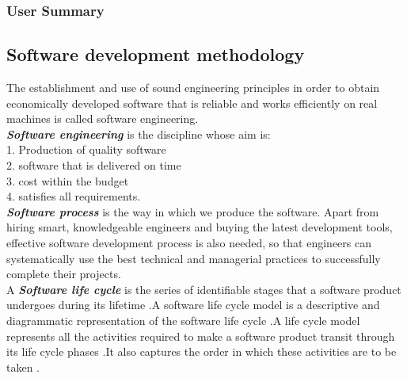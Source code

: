 \documentclass{scrartcl}
\begin{document}
  	
  	\subsubsection{User Summary}
  	
  	\subsection{Software development methodology}
  	The establishment and use of sound engineering principles in order to obtain economically
developed software that is reliable and works efficiently on real machines is called software engineering.\\
\textbf{\textit{ Software engineering}} is the discipline whose aim is:\\
1. Production of quality software\\
2. software that is delivered on time\\
3. cost within the budget\\
4. satisfies all requirements.\\
\textbf{\textit{ Software process}} is the way in which we produce the software. Apart from hiring smart,
knowledgeable engineers and buying the latest development tools, effective software
development process is also needed, so that engineers can systematically use the best technical
and managerial practices to successfully complete their projects.\\
A \textbf{\textit{ Software life cycle}} is the series of identifiable stages that a software product undergoes during
its lifetime .A software life cycle model is a descriptive and diagrammatic representation of the
software life cycle .A life cycle model represents all the activities required to make a software
product transit through its life cycle phases .It also captures the order in which these activities are
to be taken .\\
\end{document}
